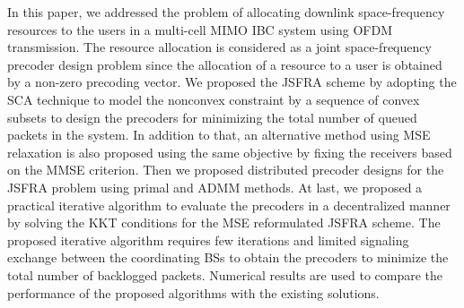 In this paper, we addressed the problem of allocating downlink space-frequency resources to the users in a multi-cell \ac{MIMO} \ac{IBC} system using \ac{OFDM} transmission. The resource allocation is considered as a joint space-frequency precoder design problem since the allocation of a resource to a user is obtained by a non-zero precoding vector. We proposed the \ac{JSFRA} scheme by adopting the \ac{SCA} technique to model the nonconvex constraint by a sequence of convex subsets to design the precoders for minimizing the total number of queued packets in the system. In addition to that, an alternative method using \ac{MSE} relaxation is also proposed using the same objective by fixing the receivers based on the \ac{MMSE} criterion. Then we proposed distributed precoder designs for the \ac{JSFRA} problem using primal and \ac{ADMM} methods. At last, we proposed a practical iterative algorithm to evaluate the precoders in a decentralized manner by solving the \ac{KKT} conditions for the \ac{MSE} reformulated \ac{JSFRA} scheme. The proposed iterative algorithm requires few iterations and limited signaling exchange between the coordinating \acp{BS} to obtain the precoders to minimize the total number of backlogged packets. Numerical results are used to compare the performance of the proposed algorithms with the existing solutions.